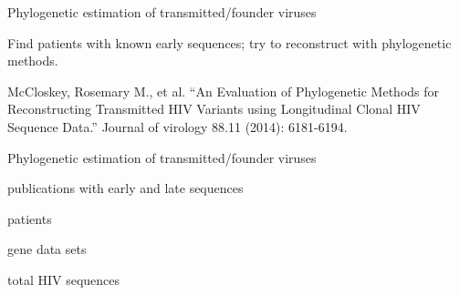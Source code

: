\documentclass{beamer}
\begin{document}
\begin{frame}{Phylogenetic estimation of transmitted/founder viruses}
    \begin{center}
\end{center}

    Find patients with known early sequences; try to reconstruct with
    phylogenetic methods.

    \tiny
    McCloskey, Rosemary M., et al. ``An Evaluation of Phylogenetic Methods for
    Reconstructing Transmitted HIV Variants using Longitudinal Clonal HIV
    Sequence Data.'' Journal of virology 88.11 (2014): 6181-6194.\par
\end{frame}

\begin{frame}{Phylogenetic estimation of transmitted/founder viruses}
    \begin{description}
        \setlength{\itemsep}{16pt}
        \item [{\Huge55}] publications with early and late sequences
        \item [{\Huge232}] patients
        \item [{\Huge335}] gene data sets
        \item [{\Huge19,486}] total HIV sequences
    \end{description}
\end{frame}
\end{document}
